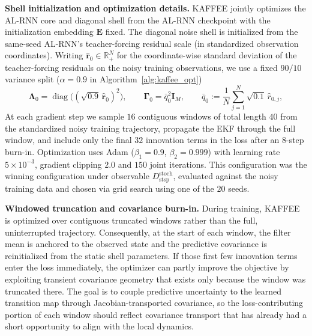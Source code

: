 \documentclass{article}
\theoremstyle{plain}
\theoremstyle{definition}
\theoremstyle{remark}
\begin{document}
\textbf{Shell initialization and optimization details.}
KAFFEE jointly optimizes the AL-RNN core and diagonal shell from the AL-RNN checkpoint with the initialization embedding $\bm E$ fixed. The diagonal noise shell is initialized from the same-seed AL-RNN's teacher-forcing residual scale (in standardized observation coordinates). Writing $\hat{\bm r}_0\in\mathbb{R}_+^N$ for the coordinate-wise standard deviation of the teacher-forcing residuals on the noisy training observations, we use a fixed $90/10$ variance split ($\alpha = 0.9$ in Algorithm~\ref{alg:kaffee_opt})
\[
\bm \Lambda_0 = \operatorname{diag} \big((\sqrt{0.9}\,\hat{\bm r}_0)^2\big),
\qquad
\bm \Gamma_0 = \bar q_0^2\bm I_M,
\qquad
\bar q_0:=\frac{1}{N}\sum_{j=1}^N \sqrt{0.1}\,\hat r_{0,j},
\]
At each gradient step we sample $16$ contiguous windows of total length $40$ from the standardized noisy training trajectory, propagate the EKF through the full window, and include only the final $32$ innovation terms in the loss after an $8$-step burn-in. Optimization uses Adam ($\beta_1 = 0.9$, $\beta_2 = 0.999$) \citep{kingma2014adam} with learning rate $5\times10^{-3}$, gradient clipping $2.0$ and $150$ joint iterations. This configuration was the winning configuration under observable $D_{\mathrm{stsp}}^{\mathrm{stoch}}$, evaluated against the noisy training data and chosen via grid search using one of the $20$ seeds. 

\textbf{Windowed truncation and covariance burn-in.}
\label{app:windowed_truncation_covburnin}
During training, KAFFEE is optimized over contiguous truncated windows rather than the full, uninterrupted trajectory. Consequently, at the start of each window, the filter mean is anchored to the observed state and the predictive covariance is reinitialized from the static shell parameters. If those first few innovation terms enter the loss immediately, the optimizer can partly improve the objective by exploiting transient covariance geometry that exists only because the window was truncated there. The goal is to couple predictive uncertainty to the learned transition map through Jacobian-transported covariance, so the loss-contributing portion of each window should reflect covariance transport that has already had a short opportunity to align with the local dynamics.
\end{document}
